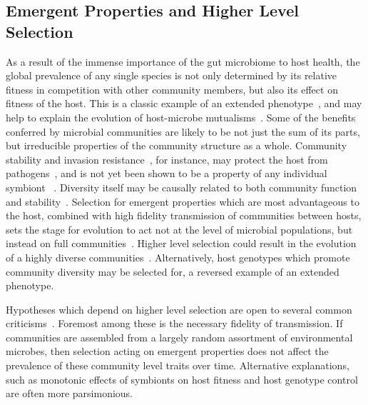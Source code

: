 \documentclass[12pt]{article}
\begin{document}
\subsection{Emergent Properties and Higher Level Selection}
As a result of the immense importance of the gut microbiome to host health,
the global prevalence of any single species is not only determined by its
relative fitness in competition with other community members,
but also its effect on fitness of the host.
This is a classic example of an extended phenotype~\citep{Dawkins1982},
and may help to explain
the evolution of host-microbe mutualisms~\citep{Dethlefsen2007a}.
Some of the benefits conferred by microbial communities
are likely to be not just the sum of its parts,
but irreducible properties of the community structure as a whole.
Community stability and invasion resistance~\citep{Levine1999},
for instance, may protect the host from pathogens~\citep{Lozupone2012},
and is not yet been shown to be a property of any individual symbiont%
~\citep{Cordero2014}.
Diversity itself may be causally related to both community function and
stability~\citep[reviewed in][]{McCann2000}.
Selection for emergent properties which are most advantageous to the host,
combined with high fidelity transmission of communities between hosts,
sets the stage for evolution to act not at the level of microbial populations,
but instead on full communities~\citep{Swenson2000,Ley2006}.
Higher level selection could result in the evolution of a highly diverse
communities~\citep{MacArthur1955}.
Alternatively, host genotypes which promote community diversity may be
selected for,
a reversed example of an extended phenotype.

Hypotheses which depend on higher level selection are open to several common
criticisms~\citep{Wade1978}.
Foremost among these is the necessary fidelity of transmission.
If communities are assembled from a largely random assortment of environmental
microbes,
then selection acting on emergent properties does not affect the prevalence
of these community level traits over time.
Alternative explanations, such as monotonic effects of symbionts on host
fitness and host genotype control are often more parsimonious.
\end{document}
